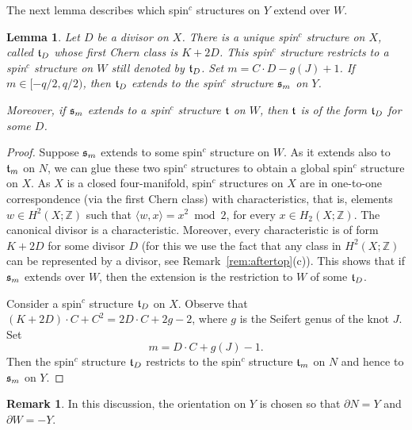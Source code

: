 \documentclass[11pt]{amsart}
\numberwithin{equation}{section}
\theoremstyle{plain}
\newtheorem{lemma}[equation]{Lemma}
\theoremstyle{definition}
\newtheorem{remark}[equation]{Remark}
\begin{document}
The next lemma describes which {spin$^c$}{} structures on $Y$ extend over $W$.
\begin{lemma}\label{lem:spinc}
Let $D$ be a divisor on $X$. There is a unique {spin$^c$}{} structure on $X$, called ${\ifmmode{{\mathfrak t}}\else{${\mathfrak t}$\ }\fi}_D$
whose first Chern class is $K+2D$. This {spin$^c$}{} structure restricts to a {spin$^c$}{} structure on $W$ still denoted by ${\ifmmode{{\mathfrak t}}\else{${\mathfrak t}$\ }\fi}_D$.
Set $m=C\cdot D-g(J)+1$. If $m\in[-q/2,q/2)$, then ${\ifmmode{{\mathfrak t}}\else{${\mathfrak t}$\ }\fi}_D$ extends to the {spin$^c$}{} structure ${\ifmmode{{\mathfrak s}}\else{${\mathfrak s}$\ }\fi}_m$
on $Y$.

Moreover, if ${\ifmmode{{\mathfrak s}}\else{${\mathfrak s}$\ }\fi}_m$ extends to a {spin$^c$}{} structure ${\ifmmode{{\mathfrak t}}\else{${\mathfrak t}$\ }\fi}$ on $W$, then ${\ifmmode{{\mathfrak t}}\else{${\mathfrak t}$\ }\fi}$ is of the form ${\ifmmode{{\mathfrak t}}\else{${\mathfrak t}$\ }\fi}_D$ for some $D$.
\end{lemma}
\begin{proof}
Suppose ${\ifmmode{{\mathfrak s}}\else{${\mathfrak s}$\ }\fi}_m$ extends to some {spin$^c$}{} structure on $W$. As it extends also to ${\ifmmode{{\mathfrak t}}\else{${\mathfrak t}$\ }\fi}_m$ on $N$, we can glue these two {spin$^c$}{} structures
to obtain a global {spin$^c$}{} structure on $X$. As $X$ is a closed four-manifold, {spin$^c$}{} structures on $X$ are in one-to-one correspondence 
(via the first Chern class) with characteristics, that is, elements
$w\in H^2(X;{\mathbb Z})$ such that $\langle w,x\rangle=x^2\bmod 2$, for every $x\in H_2(X;{\mathbb Z})$. The canonical
divisor is a characteristic. Moreover, every characteristic is of form 
$K+2D$ for some divisor $D$ (for this we use the fact that any class in $H^2(X;{\mathbb Z})$ can be represented by a divisor, see 
Remark~\ref{rem:aftertop}(c)). This shows that if ${\ifmmode{{\mathfrak s}}\else{${\mathfrak s}$\ }\fi}_m$ extends over $W$, then the extension is the restriction to $W$ of some ${\ifmmode{{\mathfrak t}}\else{${\mathfrak t}$\ }\fi}_D$.

Consider a {spin$^c$}{} structure ${\ifmmode{{\mathfrak t}}\else{${\mathfrak t}$\ }\fi}_D$ on $X$. 
Observe that $(K+2D)\cdot C+C^2=2D\cdot C+2g-2$, where $g$ is the Seifert genus of the knot $J$. Set 
\begin{equation}\label{eq:mandD}
m=D\cdot C+g(J)-1.
\end{equation} 
Then the {spin$^c$}{} structure ${\ifmmode{{\mathfrak t}}\else{${\mathfrak t}$\ }\fi}_D$ restricts to the {spin$^c$}{} structure ${\ifmmode{{\mathfrak t}}\else{${\mathfrak t}$\ }\fi}_m$ on $N$ and hence to ${\ifmmode{{\mathfrak s}}\else{${\mathfrak s}$\ }\fi}_m$ on $Y$.
\end{proof}
\begin{remark}\label{rem:orient}
In this discussion, the orientation on $Y$ is chosen so that $\partial N=Y$ and $\partial W=-Y$.
\end{remark}
\end{document}
